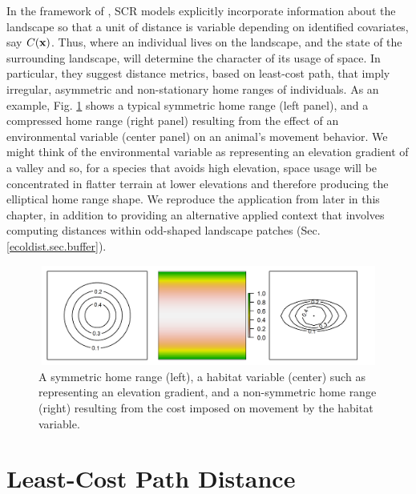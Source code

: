 In the framework of \citet{royle_etal:2012ecol}, SCR models explicitly
incorporate information about the landscape so that a unit of distance
is variable depending on identified covariates, say
$C({\bf x})$. %
Thus, where an individual lives on the landscape, and the state of the
surrounding landscape, will determine the character of its usage of
space. In particular, they suggest distance metrics, based on
least-cost path, that imply irregular, asymmetric and non-stationary
home ranges of individuals. As an example, Fig. \ref{fig.distort}
shows a typical symmetric home range (left panel), and a compressed
home range (right panel) resulting from the effect of an environmental
variable (center panel) on an animal's movement behavior. We might
think of the environmental variable as representing an elevation
gradient of a valley and so, for a species that avoids high elevation,
space usage will be concentrated in flatter terrain at lower
elevations and therefore producing the elliptical home range shape.
We reproduce the application from \citet{royle_etal:2012ecol} later in
this chapter, in addition to providing an alternative applied context
that involves computing distances within odd-shaped landscape patches
(Sec. \ref{ecoldist.sec.buffer}).


\begin{figure}[h]
\centering
\includegraphics[width=5in,height=1.3in]{Ch12-EcolDist/figs/distort}
\caption{A symmetric home range (left), a habitat variable (center)
  such as representing an elevation gradient,
  and a non-symmetric home range (right) resulting from the cost imposed on
  movement by the habitat variable.}
\label{fig.distort}
\end{figure}


\section{Least-Cost Path Distance}

